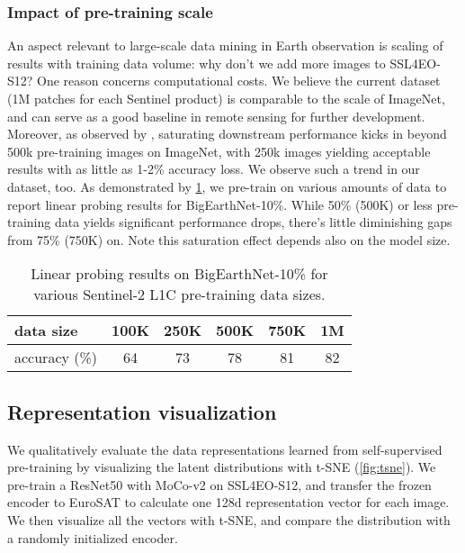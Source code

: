 \documentclass[lettersize,journal]{IEEEtran}
\begin{document}
\subsubsection{Impact of pre-training scale} An aspect relevant to large-scale data mining in Earth observation is scaling of results with training data volume: why don't we add more images to SSL4EO-S12? One reason concerns computational costs. We believe the current dataset (1M patches for each Sentinel product) is comparable to the scale of ImageNet, and can serve as a good baseline in remote sensing for further development. Moreover, as observed by \cite{cole2022does}, saturating downstream performance kicks in beyond 500k pre-training images on ImageNet, with 250k images yielding acceptable results with as little as 1-2\% accuracy loss. We observe such a trend in our dataset, too. As demonstrated by \cref{tab:dataset-size}, we pre-train on various amounts of data to report linear probing results for BigEarthNet-10\%. While 50\% (500K) or less pre-training data yields significant performance drops, there's little diminishing gaps from 75\% (750K) on. Note this saturation effect depends also on the model size.
\vspace{-0.5em}
\begin{table}[h!]
\caption{Linear probing results on BigEarthNet-10\% for various Sentinel-2 L1C pre-training data sizes.}
\label{tab:dataset-size}
\centering
\begin{tabular}{lccccc}
\hline
data size     & 100K & 250K & 500K & 750K & 1M \\ \hline \hline
accuracy (\%) & 64   & 73   & 78   & 81   & 82 \\ \hline
\end{tabular}
\end{table}



\vspace{-1.5em}
\subsection{Representation visualization}
We qualitatively evaluate the data representations learned from self-supervised pre-training by visualizing the latent distributions with t-SNE (\cref{fig:tsne}). We pre-train a ResNet50 with MoCo-v2 on SSL4EO-S12, and transfer the frozen encoder to EuroSAT to calculate one 128d representation vector for each image. We then visualize all the vectors with t-SNE, and compare the distribution with a randomly initialized encoder. 
\end{document}
